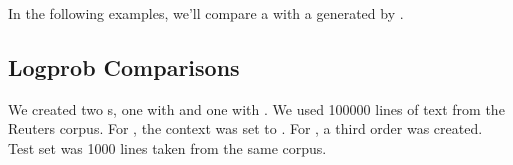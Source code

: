 \documentclass[a4paper,10pt,twoside]{report}
\begin{document}
In the following examples, we'll compare a \mb{} \lm{} with a \lm{}
generated by \srilm{}. 

\subsection{Logprob Comparisons}


We created two \lm{}s, one with \wopr{} and one with \srilm{}. We used
\num{100000} lines of text from the Reuters corpus. For
\wopr{}, the context was set to . For \srilm{}, a third
order \lm{} was created. Test set was \num{1000} lines taken from
the same corpus.

\end{document}
